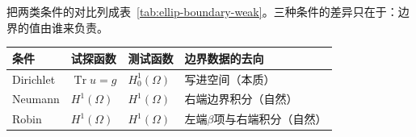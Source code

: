 把两类条件的对比列成表~\ref{tab:ellip-boundary-weak}。三种条件的差异只在于：边界的值由谁来负责。

\begin{BookInlineTable}
  \centering
  \caption{三类边界条件的弱形式。}
  \label{tab:ellip-boundary-weak}
  \begin{tabular}{llll}
    \toprule
    条件 & 试探函数 & 测试函数 & 边界数据的去向\\
    \midrule
    Dirichlet & $\operatorname{Tr}u=g$ & $H^1_0(\Omega)$ & 写进空间（本质）\\
    Neumann & $H^1(\Omega)$ & $H^1(\Omega)$ & 右端边界积分（自然）\\
    Robin & $H^1(\Omega)$ & $H^1(\Omega)$ & 左端$\beta$项与右端积分（自然）\\
    \bottomrule
  \end{tabular}
\end{BookInlineTable}
